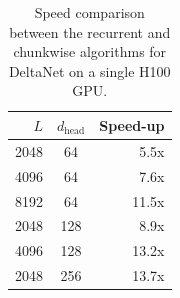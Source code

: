 \begin{table}
\vspace{-5mm}
\centering
\small 
        \begin{tabular}{rcr}
        \toprule[0.5mm]
     $L$  & $d_{\text{head}}$ &  Speed-up \\
      \bottomrule
2048 &  64 & 5.5x \\
4096 &  64 & 7.6x \\
8192 &  64 & 11.5x \\ 
2048 & 128 & 8.9x \\
4096 & 128 & 13.2x \\
2048 & 256 & 13.7x \\
        \bottomrule
        \end{tabular}
\caption{Speed comparison between the recurrent and chunkwise algorithms for DeltaNet on a single H100 GPU. }
\label{tab:kernel_speed}
\vspace{-8mm}
\end{table}

